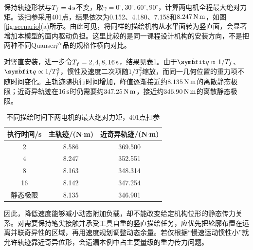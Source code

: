 保持轨迹形状与$T_f=4\,\mathrm{s}$不变，取$\gamma=0^\circ,30^\circ,60^\circ,90^\circ$，计算两电机全程最大绝对力矩。该扫参采用401点，结果依次为0.152、4.180、7.158和$8.247\,\mathrm{N\,m}$，如图\ref{fig:scenario}(a)所示。由此可见，将同样的描绘机构从水平面转为竖直面，会显著增加本模型的面内驱动负担。这里比较的是同一课程设计机构的安装方向，不是把两种不同Quanser产品的规格作横向对比。


对竖直安装，进一步令$T_f=2,4,8,16\,\mathrm{s}$，结果见表\ref{tab:speed}。由于$\dot{\vect q}\propto1/T_f$、$\ddot{\vect q}\propto1/T_f^2$，惯性及速度二次项随$1/T_f^2$缩放，而同一几何位置的重力项不随时间变化。主轨迹随执行时间增加，峰值逐渐接近约$8.135\,\mathrm{N\,m}$的离散静态极限；近奇异轨迹在$16\,\mathrm{s}$时仍需要约$347.25\,\mathrm{N\,m}$，接近约$346.90\,\mathrm{N\,m}$的离散静态极限。

\begin{table}[htbp]
\centering\caption{不同描绘时间下两电机的最大绝对力矩，401点扫参}\label{tab:speed}
\begin{tabular}{ccc}\toprule 执行时间/s & 主轨迹/(N$\cdot$m) & 近奇异轨迹/(N$\cdot$m)\\\midrule
2 & 8.586 & 369.500\\
4 & 8.247 & 352.551\\
8 & 8.163 & 348.314\\
16 & 8.142 & 347.254\\
静态极限 & 8.135 & 346.901\\\bottomrule\end{tabular}
\end{table}

因此，降低速度能够减小动态附加负载，却不能改变给定机构位形的静态传力关系。对需要保持笔尖接触并承受工具自重的竖直描绘任务，应优先把轮廓布置在远离并联奇异性的区域，再用速度规划调整动态余量。若仅根据“慢速运动惯性小”就允许轨迹靠近奇异位形，会遗漏本例中占主要量级的重力传力问题。

